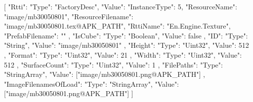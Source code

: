 [{
        "Rtti": {
            "Type": "FactoryDesc",
            "Value": {
                "InstanceType": 5,
                "ResourceName": "image/mb30050801",
                "ResourceFilename": "image/mb30050801.tex@APK_PATH",
                "RttiName": "En.Engine.Texture",
                "PrefabFilename": ""
            }
        },
        "IsCube": {
            "Type": "Boolean",
            "Value": false
        },
        "ID": {
            "Type": "String",
            "Value": "image/mb30050801"
        },
        "Height": {
            "Type": "Uint32",
            "Value": 512
        },
        "Format": {
            "Type": "Uint32",
            "Value": 21
        },
        "Width": {
            "Type": "Uint32",
            "Value": 512
        },
        "SurfaceCount": {
            "Type": "Uint32",
            "Value": 1
        },
        "FilePaths": {
            "Type": "StringArray",
            "Value": ["image/mb30050801.png@APK_PATH"]
        },
        "ImageFilenamesOfLoad": {
            "Type": "StringArray",
            "Value": ["image/mb30050801.png@APK_PATH"]
        }
    }]